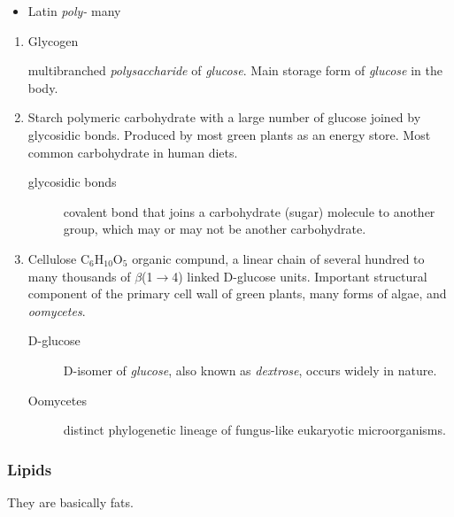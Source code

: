 \documentclass[11pt]{article}
\begin{document}
\begin{enumerate}
\begin{itemize}
\item Latin \emph{poly-} many
\end{itemize}

\begin{enumerate}
\item Glycogen
\label{sec:org6f84651}

multibranched \emph{polysaccharide} of \emph{glucose}. Main storage form of
\emph{glucose} in the body.

\item Starch
\label{sec:org613d2b8}
polymeric carbohydrate with a large number of glucose joined by glycosidic
bonds. Produced by most green plants as an energy store. Most common
carbohydrate in human diets.

\begin{description}
\item[{glycosidic bonds}] covalent bond that joins a carbohydrate (sugar)
molecule to another group, which may or may not be another
carbohydrate.
\end{description}

\item Cellulose C\(_{\text{6}}\)H\(_{\text{10}}\)O\(_{\text{5}}\)
\label{sec:orgf6a7c6d}
organic compund, a linear chain of several hundred to many thousands of
\(\beta\)(1\(\rightarrow\)4) linked D-glucose units. Important structural component of the
primary cell wall of green plants, many forms of algae, and \emph{oomycetes}.

\begin{description}
\item[{D-glucose}] D-isomer of \emph{glucose}, also known as \emph{dextrose}, occurs widely
in nature.

\item[{Oomycetes}] distinct phylogenetic lineage of fungus-like eukaryotic
microorganisms.
\end{description}
\end{enumerate}
\end{enumerate}

\subsubsection{Lipids}
\label{sec:orged5276d}
They are basically fats.
\end{document}
